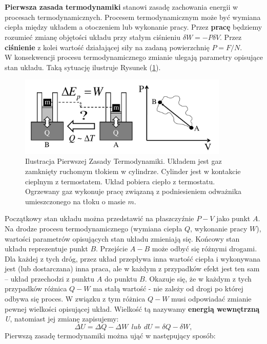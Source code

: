 \documentclass[12pt,a4paper,openright]{report} %
\begin{document}
\\
\\
\textbf{Pierwsza zasada termodynamiki} stanowi zasadę zachowania energii w procesach termodynamicznych. Procesem termodynamicznym może być wymiana ciepła między układem a otoczeniem lub wykonanie pracy. Przez \textbf{pracę} będziemy rozumieć zmianę objętości układu przy stałym ciśnieniu $\delta W= -P \delta V$. Przez \textbf{ciśnienie} z kolei wartość działającej siły na zadaną powierzchnię $P=F/N$.\\
W konsekwencji procesu termodynamicznego zmianie ulegają parametry opisujące stan układu. Taką sytuację ilustruje Rysunek (\ref{4_PZT}). 
%
\begin{figure}[h!]
\centering
\includegraphics[width=10cm, clip]{rysunki/4_PZT}
\caption{Ilustracja Pierwszej Zasady Termodynamiki. Układem jest gaz zamknięty ruchomym tłokiem w cylindrze. Cylinder jest w kontakcie cieplnym z termostatem. Układ pobiera ciepło z termostatu. Ogrzewany gaz wykonuje pracę związaną z podniesieniem odważnika umieszczonego na tłoku o masie $m$.}
\label{4_PZT}
\end{figure}
%
Początkowy stan układu można przedstawić na płaszczyźnie $P-V$ jako punkt $A$. Na drodze procesu termodynamicznego (wymiana ciepła $Q$, wykonanie pracy $W$), wartości parametrów opisujących stan układu zmieniają się. Końcowy stan układu reprezentuje punkt $B$. Przejście $A-B$ może odbyć się różnymi drogami. Dla każdej z tych dróg, przez układ przepływa inna wartość ciepła i wykonywana jest (lub dostarczana) inna praca, ale w każdym z przypadków efekt jest ten sam – układ przechodzi z punktu $A$ do punktu $B$. Okazuje się, że w każdym z tych przypadków różnica $Q-W$ ma stałą wartość - nie zależy od drogi po której odbywa się proces. W związku z tym różnica $Q-W$ musi odpowiadać zmianie pewnej wielkości opisującej układ. Wielkość tą nazywamy \textbf{energią wewnętrzną} \textit{U}, natomiast jej zmianę zapisujemy:
\begin{equation}
\Delta U=\Delta Q- \Delta W ~~ lub ~~ d U = \delta Q - \delta W,
\end{equation}
Pierwszą zasadę termodynamiki można ująć w następujący sposób:
\end{document}
